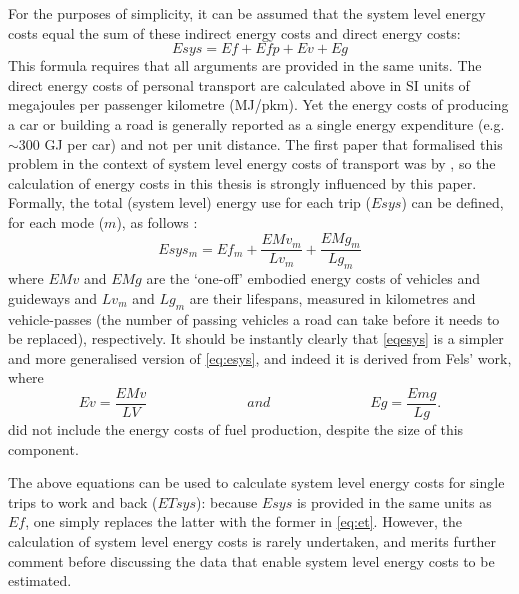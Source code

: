 \documentclass[a4paper, 11pt, twoside]{Thesis}
\begin{document}
For the purposes of simplicity, it can be assumed that the system level energy
costs equal the sum of these indirect energy costs and direct energy costs:
\begin{equation}
 Esys = Ef + Efp + Ev + Eg
 \label{eqesys}
\end{equation}
This formula requires that all arguments are provided in the same units.
The direct energy costs of personal transport are calculated above in SI
units of megajoules per passenger kilometre (MJ/pkm). Yet the energy costs of
producing a car or building a road is generally reported as a single energy
expenditure (e.g.~$\sim$300 GJ per car) and not per unit distance.
The first paper that formalised this problem in the context of system level
energy costs of transport was by \citet{Fels1975}, so the calculation of
energy costs in this thesis is strongly influenced by this paper.
Formally, the total (system level) energy use for each trip ($Esys$) can be
defined, for each mode ($m$), as follows \citet{Fels1975}:
\begin{equation}
Esys_m =  Ef_m +  \frac{EMv_m}{Lv_m} + \frac{EMg_m}{Lg_m}
\label{eq:esys}
\end{equation}
where $EMv$ and $EMg$ are the `one-off' embodied energy costs of
vehicles and guideways and
$Lv_m$ and $Lg_m$ are their lifespans,
measured in kilometres and vehicle-passes (the number of passing vehicles a road
can take before it needs to be replaced), respectively.
It should be instantly clearly that \cref{eqesys} is a simpler and
more generalised version
of \cref{eq:esys}, and indeed it is derived from Fels' work, where
\begin{equation}
 Ev = \frac{EMv}{LV} \hspace{3cm} and  \hspace{3cm} Eg =
\frac{Emg}{Lg}.
\end{equation}
\citet{Fels1975} did not include the energy costs of fuel production, despite
the size of this component.

The above equations can be used to calculate
system level energy costs for single trips to work and back ($ETsys$):
because $Esys$ is provided in the same units as $Ef$, one simply replaces the
latter with the former in \cref{eq:et}. 
However, the calculation of
system level energy costs is rarely undertaken, and merits further comment
before
discussing the data that enable system level energy costs to be estimated. 
\end{document}
